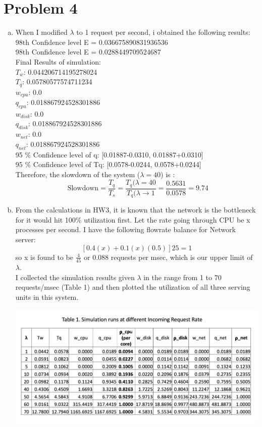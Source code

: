 \documentclass{article}   	                         %
\begin{document}
\section*{Problem 4}
\begin{enumerate}[(a)]
\item
When I modified $\lambda$ to 1 request per second, i obtained the following results:\\
98th Confidence level E = 0.036675890831936536\\
98th Confidence level E = 0.0288449709524687\\
Final Results of simulation: \\
	$T_w$: 0.044206714195278024\\
	$T_q$: 0.05780577574711234\\
	$w_{cpu}$: 0.0\\
	$q_{cpu}$: 0.018867924528301886\\
	$w_{disk}$: 0.0\\
	$q_{disk}$: 0.018867924528301886\\
	$w_{net}$: 0.0\\
	$q_{net}$: 0.018867924528301886\\
	95 $\%$ Confidence level of q: [0.01887-0.0310, 0.01887+0.0310]\\
	95 $\%$ Confidence level of Tq: [0.0578-0.0244, 0.0578+0.0244]\\
Therefore, the slowdown of the system ($\lambda = 40$) is :\\
$$\text{ Slowdown} = \frac{T_q}{T_s} = \frac{T_q (\lambda=40}{T_q (\lambda\rightarrow 1} = \frac{0.5631}{0.0578}= 9.74$$
\item
From the calculations in HW3, it is known that the network is the bottleneck for it would hit 100$\%$ utilization first.  Let the rate going through CPU be x processes per second. I have the following flowrate balance for Network server:\\
$$[0.4(x) + 0.1(x) (0.5)]25 = 1$$
so x is found to be $\frac{4}{45}$ or 0.088 requests per msec, which is our upper limit of $\lambda$.\\
I collected the simulation results given $\lambda$ in the range from 1 to 70 requests/msec (Table 1) and then plotted the utilization of all three serving units in this system. 
\begin{center}
\includegraphics[scale = 0.2]{Figure3.jpg}

\end{center}
\end{enumerate}
\end{document}
